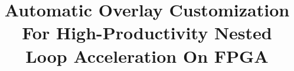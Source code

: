 \documentclass{acm_proc_article-sp}
\begin{document}
\title{Automatic Overlay Customization For High-Productivity Nested Loop Acceleration On FPGA}

 \author{
 \alignauthor
 }

\maketitle

\begin{abstract}

\end{abstract}
 

%
%
%
%
%











\end{document}
